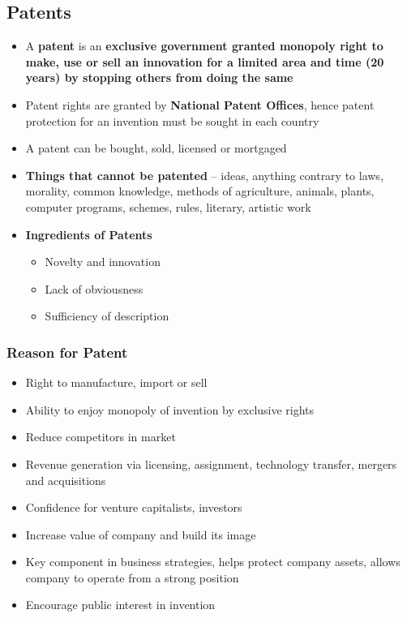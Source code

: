 \documentclass{article}
\begin{document}
\subsection{Patents}

\begin{itemize}
    \item A \textbf{patent} is an \textbf{exclusive government granted monopoly right to make, use or sell an innovation for a limited area and time (20 years) by stopping others from doing the same} 
    \item Patent rights are granted by \textbf{National Patent Offices}, hence patent protection for an invention must be sought in each country
    \item A patent can be bought, sold, licensed or mortgaged
    \item \textbf{Things that cannot be patented} -- ideas, anything contrary to laws, morality, common knowledge, methods of agriculture, animals, plants, computer programs, schemes, rules, literary, artistic work
    \item \textbf{Ingredients of Patents}
    \begin{itemize}
        \item Novelty and innovation
        \item Lack of obviousness
        \item Sufficiency of description
    \end{itemize}
\end{itemize}

\subsubsection{Reason for Patent}

\begin{itemize}
    \item Right to manufacture, import or sell
    \item Ability to enjoy monopoly of invention by exclusive rights
    \item Reduce competitors in market
    \item Revenue generation via licensing, assignment, technology transfer, mergers and acquisitions
    \item Confidence for venture capitalists, investors
    \item Increase value of company and build its image
    \item Key component in business strategies, helps protect company assets, allows company to operate from a strong position
    \item Encourage public interest in invention
\end{itemize}
\end{document}
